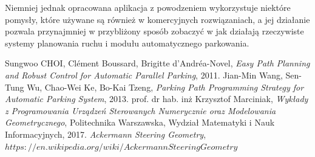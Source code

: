 \documentclass[a4paper,11pt,twoside]{report}
\theoremstyle{definition}
\begin{document}
Niemniej jednak opracowana aplikacja z powodzeniem wykorzystuje niektóre pomysły, które używane są również w komercyjnych rozwiązaniach, a jej działanie pozwala przynajmniej w przybliżony sposób zobaczyć w jak działają rzeczywiste systemy planowania ruchu i modułu automatycznego parkowania.


\begin{thebibliography}{20}%

 Sungwoo CHOI, Clément Boussard, Brigitte d’Andréa-Novel, \emph{Easy Path Planning and Robust Control for Automatic Parallel Parking}, 2011.
  Jian-Min Wang, Sen-Tung Wu, Chao-Wei Ke, Bo-Kai Tzeng, \emph{Parking Path Programming Strategy for Automatic Parking System}, 2013.
 prof. dr hab. inż Krzysztof Marciniak, \emph{Wykłady z Programowania Urządzeń Sterowanych Numerycznie oraz Modelowania Geometrycznego}, Politechnika Warszawska, Wydział Matematyki i Nauk Informacyjnych, 2017.
 \emph{Ackermann Steering Geometry}, $https://en.wikipedia.org/wiki/AckermannSteeringGeometry$
\end{thebibliography}
\thispagestyle{empty}





\listoffigures
\thispagestyle{empty}





\end{document}
